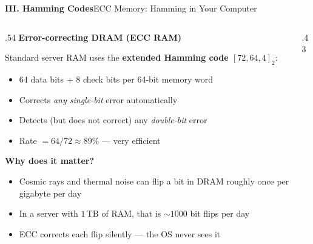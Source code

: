 \begin{frame}{\textbf{III. Hamming Codes}}{ECC Memory: Hamming in Your Computer}
\small
\begin{columns}[T,onlytextwidth]
  \begin{column}{.54\textwidth}
    \textcolor{TealDarkCyan}{\textbf{Error-correcting DRAM (ECC RAM)}}

    \medskip
    Standard server RAM uses the \textbf{extended Hamming code $[72, 64, 4]_2$}:
    \begin{itemize}
      \item $64$ data bits + $8$ check bits per 64-bit memory word
      \item Corrects \emph{any single-bit} error automatically
      \item Detects (but does not correct) any \emph{double-bit} error
      \item Rate $= 64/72 \approx 89\%$ — very efficient
    \end{itemize}

    \medskip
    \textcolor{TealDarkCyan}{\textbf{Why does it matter?}}
    \begin{itemize}
      \item Cosmic rays and thermal noise can flip a bit in DRAM roughly once per gigabyte per day
      \item In a server with $1\,\text{TB}$ of RAM, that is $\sim 1000$ bit flips per day
      \item ECC corrects each flip silently — the OS never sees it
    \end{itemize}
  \end{column}
  \begin{column}{.43\textwidth}
\end{column}
\end{columns}
\end{frame}
